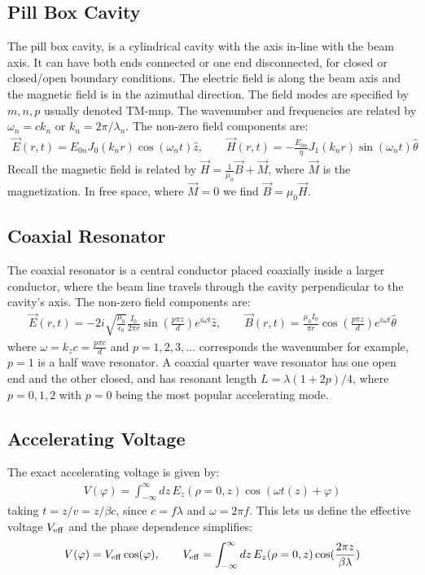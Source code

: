 \documentclass{article}
\numberwithin{equation}{section}
\begin{document}
\subsection{Pill Box Cavity}
The pill box cavity, is a cylindrical cavity with the axis in-line with the beam axis. It can have both ends connected or one end disconnected, for closed or closed/open boundary conditions. The electric field is along the beam axis and the magnetic field is in the azimuthal direction. The field modes are specified by $m,n,p$ usually denoted TM-mnp. The wavenumber and frequencies are related by $\omega_n = c k_n$ or $k_n = 2 \pi / \lambda_n$. The non-zero field components are:
\begin{align}
\vec{E}(r,t) = E_{0n} J_0(k_n r) \cos (\omega_n t) \hat{z} ,\qquad
\vec{H}(r,t) = - \frac{E_{0n}}{\eta} J_1(k_n r) \sin (\omega_n t) \hat{\theta}
\end{align}
Recall the magnetic field is related by $\vec{H} = \frac{1}{\mu_0} \vec{B} + \vec{M}$, where $\vec{M}$ is the magnetization. In free space, where $\vec{M}=0$ we find $\vec{B} = \mu_0 \vec{H}$.

\subsection{Coaxial Resonator}
The coaxial resonator is a central conductor placed coaxially inside a larger conductor, where the beam line travels through the cavity perpendicular to the cavity's axis. The non-zero field components are:
\begin{align}
\vec{E}(r,t) = -2 i \sqrt{\frac{\mu_0}{\epsilon_0}} \frac{I_0}{2 \pi r} \sin \left( \frac{p \pi z}{d} \right) e^{i \omega t} \hat{z} ,\qquad
\vec{B}(r,t) = \frac{\mu_0 I_0}{\pi r} \cos \left( \frac{p \pi z}{d} \right) e^{i \omega t} \hat{\theta}
\end{align}
where $\omega = k_z c = \frac{p \pi c}{d}$ and $p=1,2,3,\dots$ corresponds the wavenumber for example, $p=1$ is a half wave resonator. A coaxial quarter wave resonator has one open end and the other closed, and has resonant length $L = \lambda(1+2p)/4$, where $p=0,1,2$ with $p=0$ being the most popular accelerating mode.

\subsection{ Accelerating Voltage }
The exact accelerating voltage is given by:
\begin{align}
V(\varphi) = \int_{-\infty}^{\infty} dz \, E_z(\rho=0,z) \cos(\omega t(z)+ \varphi)
\end{align}
taking $t=z/v = z/ \beta c$, since $c = f \lambda$ and $\omega = 2 \pi f$. This lets us define the effective voltage $V_{\rm eff}$ and the phase dependence simplifies:
\begin{align}
V(\varphi) = V_{\rm eff} \cos(\varphi) ,\qquad 
V_{\rm eff} = \int_{-\infty}^{\infty} dz \, E_z(\rho=0,z) \cos(\frac{2 \pi z}{\beta \lambda})
\end{align}
\end{document}
